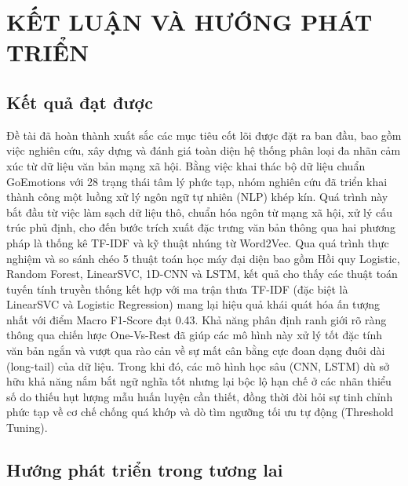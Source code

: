 
\chapter{KẾT LUẬN VÀ HƯỚNG PHÁT TRIỂN} %

\label{Chapter5} %


\section{Kết quả đạt được}

Đề tài đã hoàn thành xuất sắc các mục tiêu cốt lõi được đặt ra ban đầu, bao gồm việc nghiên cứu, xây dựng và đánh giá toàn diện hệ thống phân loại đa nhãn cảm xúc từ dữ liệu văn bản mạng xã hội. Bằng việc khai thác bộ dữ liệu chuẩn GoEmotions với 28 trạng thái tâm lý phức tạp, nhóm nghiên cứu đã triển khai thành công một luồng xử lý ngôn ngữ tự nhiên (NLP) khép kín. Quá trình này bắt đầu từ việc làm sạch dữ liệu thô, chuẩn hóa ngôn từ mạng xã hội, xử lý cấu trúc phủ định, cho đến bước trích xuất đặc trưng văn bản thông qua hai phương pháp là thống kê TF-IDF và kỹ thuật nhúng từ Word2Vec. Qua quá trình thực nghiệm và so sánh chéo 5 thuật toán học máy đại diện bao gồm Hồi quy Logistic, Random Forest, LinearSVC, 1D-CNN và LSTM, kết quả cho thấy các thuật toán tuyến tính truyền thống kết hợp với ma trận thưa TF-IDF (đặc biệt là LinearSVC và Logistic Regression) mang lại hiệu quả khái quát hóa ấn tượng nhất với điểm Macro F1-Score đạt 0.43. Khả năng phân định ranh giới rõ ràng thông qua chiến lược One-Vs-Rest đã giúp các mô hình này xử lý tốt đặc tính văn bản ngắn và vượt qua rào cản về sự mất cân bằng cực đoan dạng đuôi dài (long-tail) của dữ liệu. Trong khi đó, các mô hình học sâu (CNN, LSTM) dù sở hữu khả năng nắm bắt ngữ nghĩa tốt nhưng lại bộc lộ hạn chế ở các nhãn thiểu số do thiếu hụt lượng mẫu huấn luyện cần thiết, đồng thời đòi hỏi sự tinh chỉnh phức tạp về cơ chế chống quá khớp và dò tìm ngưỡng tối ưu tự động (Threshold Tuning).

\section{Hướng phát triển trong tương lai}

